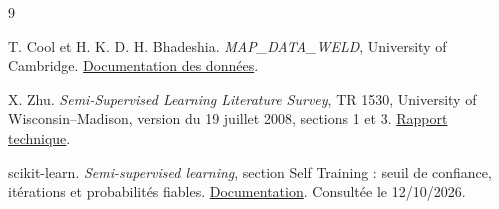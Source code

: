 \documentclass[10pt,a4paper]{article}
\begin{document}
\begingroup\footnotesize\setlength{\parskip}{1pt}\begin{thebibliography}{9}

 T. Cool et H. K. D. H. Bhadeshia. \emph{MAP\_DATA\_WELD}, University of Cambridge. \href{https://www.phase-trans.msm.cam.ac.uk/map/data/materials/welddb-b.html}{Documentation des données}.

 X. Zhu. \emph{Semi-Supervised Learning Literature Survey}, TR 1530, University of Wisconsin--Madison, version du 19 juillet 2008, sections 1 et 3. \href{https://pages.cs.wisc.edu/~jerryzhu/pub/ssl_survey.pdf}{Rapport technique}.

 scikit-learn. \emph{Semi-supervised learning}, section Self Training : seuil de confiance, itérations et probabilités fiables. \href{https://scikit-learn.org/stable/modules/semi_supervised.html}{Documentation}. Consultée le 12/10/2026.

\end{thebibliography}\endgroup
\end{document}
